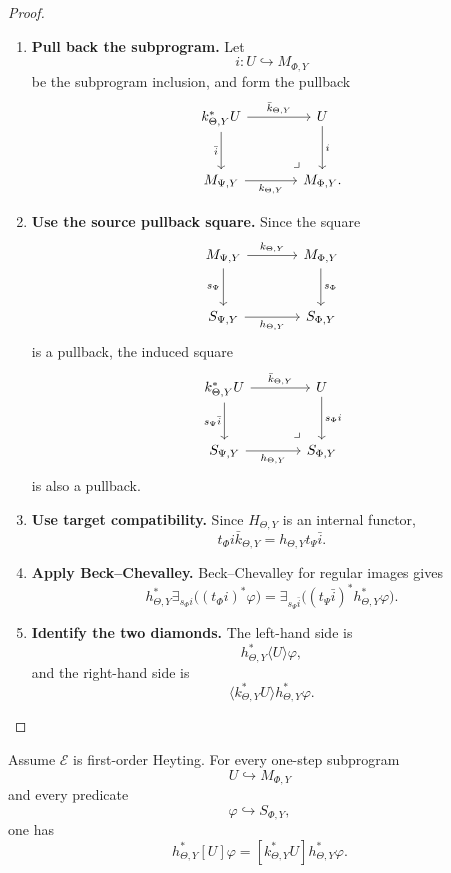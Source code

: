 \begin{proof}
\leavevmode
\begin{enumerate}
\item \textbf{Pull back the subprogram.}
Let
\[
i:U\hookrightarrow M_{\Phi,Y}
\]
be the subprogram inclusion, and form the pullback
\[
\begin{tikzcd}[column sep=large,row sep=large]
k_{\Theta,Y}^\ast U
  \arrow[r,"\bar k_{\Theta,Y}"]
  \arrow[d,"\bar i"']
&
U
  \arrow[d,"i"]
\\
M_{\Psi,Y}
  \arrow[r,"k_{\Theta,Y}"']
&
M_{\Phi,Y}
\arrow[ul,phantom,very near start,"\lrcorner"] .
\end{tikzcd}
\]

\item \textbf{Use the source pullback square.}
Since the square
\[
\begin{tikzcd}[column sep=large,row sep=large]
M_{\Psi,Y} \arrow[r,"k_{\Theta,Y}"] \arrow[d,"s_\Psi"']
&
M_{\Phi,Y} \arrow[d,"s_\Phi"]
\\
S_{\Psi,Y} \arrow[r,"h_{\Theta,Y}"']
&
S_{\Phi,Y}
\end{tikzcd}
\]
is a pullback, the induced square
\[
\begin{tikzcd}[column sep=large,row sep=large]
k_{\Theta,Y}^\ast U
  \arrow[r,"\bar k_{\Theta,Y}"]
  \arrow[d,"s_\Psi\bar i"']
&
U
  \arrow[d,"s_\Phi i"]
\\
S_{\Psi,Y}
  \arrow[r,"h_{\Theta,Y}"']
&
S_{\Phi,Y}
\arrow[ul,phantom,very near start,"\lrcorner"]
\end{tikzcd}
\]
is also a pullback.

\item \textbf{Use target compatibility.}
Since \(H_{\Theta,Y}\) is an internal functor,
\[
t_\Phi i\bar k_{\Theta,Y}=h_{\Theta,Y}t_\Psi\bar i.
\]

\item \textbf{Apply Beck--Chevalley.}
Beck--Chevalley for regular images gives
\[
h_{\Theta,Y}^\ast
\exists_{s_\Phi i}\bigl((t_\Phi i)^\ast\varphi\bigr)
=
\exists_{s_\Psi\bar i}
\bigl((t_\Psi\bar i)^\ast h_{\Theta,Y}^\ast\varphi\bigr).
\]

\item \textbf{Identify the two diamonds.}
The left-hand side is
\[
h_{\Theta,Y}^\ast\langle U\rangle\varphi,
\]
and the right-hand side is
\[
\langle k_{\Theta,Y}^\ast U\rangle h_{\Theta,Y}^\ast\varphi.
\]
\end{enumerate}
\end{proof}

\begin{proposition}
\label{prop:poly-relative-box-stability-simulation}
Assume \(\mathcal E\) is first-order Heyting.  For every one-step subprogram
\[
U\hookrightarrow M_{\Phi,Y}
\]
and every predicate
\[
\varphi\hookrightarrow S_{\Phi,Y},
\]
one has
\[
h_{\Theta,Y}^\ast[U]\varphi
=
[k_{\Theta,Y}^\ast U]h_{\Theta,Y}^\ast\varphi.
\]
\end{proposition}

